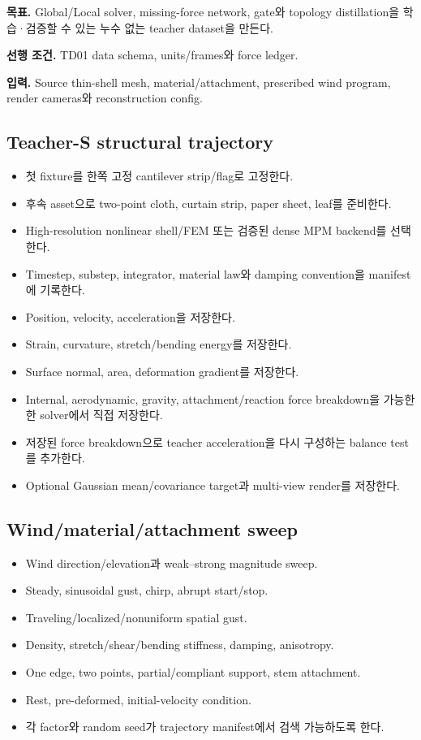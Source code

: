 \documentclass[10pt,a4paper]{article}
\newcommand{\todo}{\textcolor{TodoGray}{\(\square\)}}
\begin{document}
\textbf{목표.}
Global/Local solver, missing-force network, gate와 topology distillation을 학습·검증할 수 있는 누수 없는 teacher dataset을 만든다.

\textbf{선행 조건.} TD01 data schema, units/frames와 force ledger.

\textbf{입력.}
Source thin-shell mesh, material/attachment, prescribed wind program, render cameras와 reconstruction config.

\subsection*{Teacher-S structural trajectory}

\begin{itemize}
  \item[\todo] 첫 fixture를 한쪽 고정 cantilever strip/flag로 고정한다.
  \item[\todo] 후속 asset으로 two-point cloth, curtain strip, paper sheet, leaf를 준비한다.
  \item[\todo] High-resolution nonlinear shell/FEM 또는 검증된 dense MPM backend를 선택한다.
  \item[\todo] Timestep, substep, integrator, material law와 damping convention을 manifest에 기록한다.
  \item[\todo] Position, velocity, acceleration을 저장한다.
  \item[\todo] Strain, curvature, stretch/bending energy를 저장한다.
  \item[\todo] Surface normal, area, deformation gradient를 저장한다.
  \item[\todo] Internal, aerodynamic, gravity, attachment/reaction force breakdown을 가능한 한 solver에서 직접 저장한다.
  \item[\todo] 저장된 force breakdown으로 teacher acceleration을 다시 구성하는 balance test를 추가한다.
  \item[\todo] Optional Gaussian mean/covariance target과 multi-view render를 저장한다.
\end{itemize}

\subsection*{Wind/material/attachment sweep}

\begin{itemize}
  \item[\todo] Wind direction/elevation과 weak--strong magnitude sweep.
  \item[\todo] Steady, sinusoidal gust, chirp, abrupt start/stop.
  \item[\todo] Traveling/localized/nonuniform spatial gust.
  \item[\todo] Density, stretch/shear/bending stiffness, damping, anisotropy.
  \item[\todo] One edge, two points, partial/compliant support, stem attachment.
  \item[\todo] Rest, pre-deformed, initial-velocity condition.
  \item[\todo] 각 factor와 random seed가 trajectory manifest에서 검색 가능하도록 한다.
\end{itemize}
\end{document}
